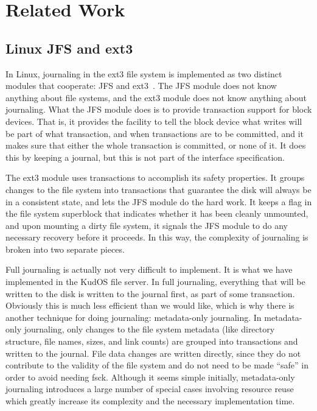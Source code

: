 \section{Related Work}
\label{sec:related}

\subsection{Linux JFS and ext3}
\label{sec:related:ext3}

In Linux, journaling in the ext3 file system is implemented as two distinct
modules that cooperate: JFS and ext3~\cite{tweedie98journaling}. The JFS module
does not know anything about file systems, and the ext3 module does not know
anything about journaling. What the JFS module does is to provide transaction
support for block devices. That is, it provides the facility to tell the block
device what writes will be part of what transaction, and when transactions are
to be committed, and it makes sure that either the whole transaction is
committed, or none of it. It does this by keeping a journal, but this is not
part of the interface specification.

The ext3 module uses transactions to accomplish its safety properties. It groups
changes to the file system into transactions that guarantee the disk will always
be in a consistent state, and lets the JFS module do the hard work. It keeps a
flag in the file system superblock that indicates whether it has been cleanly
unmounted, and upon mounting a dirty file system, it signals the JFS module to do
any necessary recovery before it proceeds. In this way, the complexity of
journaling is broken into two separate pieces.

Full journaling is actually not very difficult to implement. It is what we have
implemented in the KudOS file server. In full journaling, everything that will
be written to the disk is written to the journal first, as part of some
transaction. Obviously this is much less efficient than we would like, which is
why there is another technique for doing journaling: metadata-only journaling.
In metadata-only journaling, only changes to the file system metadata (like
directory structure, file names, sizes, and link counts) are grouped into
transactions and written to the journal. File data changes are written directly,
since they do not contribute to the validity of the file system and do not need
to be made ``safe'' in order to avoid needing fsck. Although it seems simple
initially, metadata-only journaling introduces a large number of special cases
involving resource reuse which greatly increase its complexity and the necessary
implementation time.


